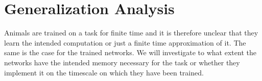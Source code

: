 \documentclass{article} %
\newcommand{\mpcomment}[1]{\textcolor{mpcolor}{(#1)}}
\newcounter{ct}
\theoremstyle{definition}
\theoremstyle{remark}
\begin{document}





\section{Generalization Analysis}


Animals are trained on a task for finite time and it is therefore unclear that they learn the intended computation or just a finite time approximation of it.
The same is the case for the trained networks.
We will investigate to what extent the networks have the intended memory necessary for the task or whether they implement it on the timescale on which they have been trained.

\end{document}
